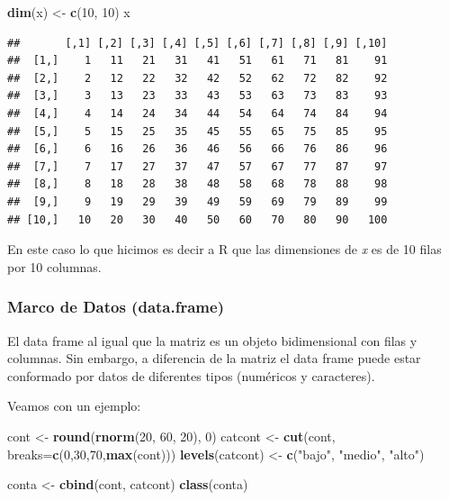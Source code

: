 \documentclass[]{article}
\newenvironment{Shaded}{\begin{snugshade}}{\end{snugshade}}
\newcommand{\KeywordTok}[1]{\textcolor[rgb]{0.13,0.29,0.53}{\textbf{{#1}}}}
\newcommand{\DataTypeTok}[1]{\textcolor[rgb]{0.13,0.29,0.53}{{#1}}}
\newcommand{\DecValTok}[1]{\textcolor[rgb]{0.00,0.00,0.81}{{#1}}}
\newcommand{\StringTok}[1]{\textcolor[rgb]{0.31,0.60,0.02}{{#1}}}
\newcommand{\NormalTok}[1]{{#1}}
\begin{document}
\begin{Shaded}
\begin{Highlighting}[]
\KeywordTok{dim}\NormalTok{(x) <-}\StringTok{ }\KeywordTok{c}\NormalTok{(}\DecValTok{10}\NormalTok{, }\DecValTok{10}\NormalTok{)}
\NormalTok{x}
\end{Highlighting}
\end{Shaded}

\begin{verbatim}
##       [,1] [,2] [,3] [,4] [,5] [,6] [,7] [,8] [,9] [,10]
##  [1,]    1   11   21   31   41   51   61   71   81    91
##  [2,]    2   12   22   32   42   52   62   72   82    92
##  [3,]    3   13   23   33   43   53   63   73   83    93
##  [4,]    4   14   24   34   44   54   64   74   84    94
##  [5,]    5   15   25   35   45   55   65   75   85    95
##  [6,]    6   16   26   36   46   56   66   76   86    96
##  [7,]    7   17   27   37   47   57   67   77   87    97
##  [8,]    8   18   28   38   48   58   68   78   88    98
##  [9,]    9   19   29   39   49   59   69   79   89    99
## [10,]   10   20   30   40   50   60   70   80   90   100
\end{verbatim}

En este caso lo que hicimos es decir a R que las dimensiones de \emph{x}
es de 10 filas por 10 columnas.

\subsubsection{Marco de Datos
(data.frame)}\label{marco-de-datos-data.frame}

El data frame al igual que la matriz es un objeto bidimensional con
filas y columnas. Sin embargo, a diferencia de la matriz el data frame
puede estar conformado por datos de diferentes tipos (numéricos y
caracteres).

Veamos con un ejemplo:

\begin{Shaded}
\begin{Highlighting}[]
\NormalTok{cont <-}\StringTok{ }\KeywordTok{round}\NormalTok{(}\KeywordTok{rnorm}\NormalTok{(}\DecValTok{20}\NormalTok{, }\DecValTok{60}\NormalTok{, }\DecValTok{20}\NormalTok{), }\DecValTok{0}\NormalTok{)}
\NormalTok{catcont <-}\StringTok{ }\KeywordTok{cut}\NormalTok{(cont, }\DataTypeTok{breaks=}\KeywordTok{c}\NormalTok{(}\DecValTok{0}\NormalTok{,}\DecValTok{30}\NormalTok{,}\DecValTok{70}\NormalTok{,}\KeywordTok{max}\NormalTok{(cont)))}
\KeywordTok{levels}\NormalTok{(catcont) <-}\StringTok{ }\KeywordTok{c}\NormalTok{(}\StringTok{"bajo"}\NormalTok{, }\StringTok{"medio"}\NormalTok{, }\StringTok{"alto"}\NormalTok{) }

\NormalTok{conta <-}\StringTok{ }\KeywordTok{cbind}\NormalTok{(cont, catcont)}
\KeywordTok{class}\NormalTok{(conta)}
\end{Highlighting}
\end{Shaded}
\end{document}
